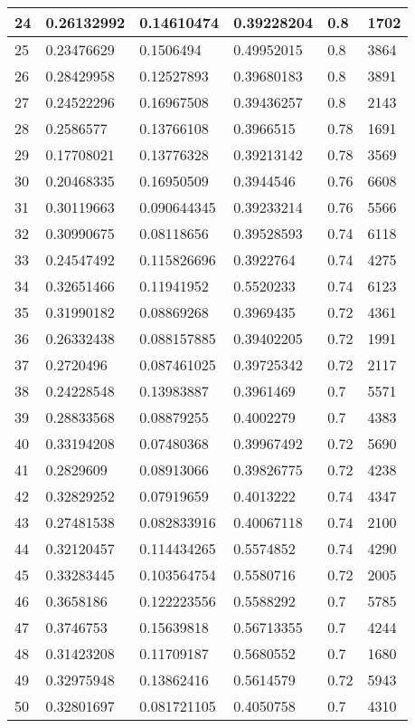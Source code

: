 \begin{longtable}{|l|l|l|l|l|l|}
24 & 0.26132992 & 0.14610474 & 0.39228204 & 0.8 & 1702 \\ \hline 
25 & 0.23476629 & 0.1506494 & 0.49952015 & 0.8 & 3864 \\ \hline 
26 & 0.28429958 & 0.12527893 & 0.39680183 & 0.8 & 3891 \\ \hline 
27 & 0.24522296 & 0.16967508 & 0.39436257 & 0.8 & 2143 \\ \hline 
28 & 0.2586577 & 0.13766108 & 0.3966515 & 0.78 & 1691 \\ \hline 
29 & 0.17708021 & 0.13776328 & 0.39213142 & 0.78 & 3569 \\ \hline 
30 & 0.20468335 & 0.16950509 & 0.3944546 & 0.76 & 6608 \\ \hline 
31 & 0.30119663 & 0.090644345 & 0.39233214 & 0.76 & 5566 \\ \hline 
32 & 0.30990675 & 0.08118656 & 0.39528593 & 0.74 & 6118 \\ \hline 
33 & 0.24547492 & 0.115826696 & 0.3922764 & 0.74 & 4275 \\ \hline 
34 & 0.32651466 & 0.11941952 & 0.5520233 & 0.74 & 6123 \\ \hline 
35 & 0.31990182 & 0.08869268 & 0.3969435 & 0.72 & 4361 \\ \hline 
36 & 0.26332438 & 0.088157885 & 0.39402205 & 0.72 & 1991 \\ \hline 
37 & 0.2720496 & 0.087461025 & 0.39725342 & 0.72 & 2117 \\ \hline 
38 & 0.24228548 & 0.13983887 & 0.3961469 & 0.7 & 5571 \\ \hline 
39 & 0.28833568 & 0.08879255 & 0.4002279 & 0.7 & 4383 \\ \hline 
40 & 0.33194208 & 0.07480368 & 0.39967492 & 0.72 & 5690 \\ \hline 
41 & 0.2829609 & 0.08913066 & 0.39826775 & 0.72 & 4238 \\ \hline 
42 & 0.32829252 & 0.07919659 & 0.4013222 & 0.74 & 4347 \\ \hline 
43 & 0.27481538 & 0.082833916 & 0.40067118 & 0.74 & 2100 \\ \hline 
44 & 0.32120457 & 0.114434265 & 0.5574852 & 0.74 & 4290 \\ \hline 
45 & 0.33283445 & 0.103564754 & 0.5580716 & 0.72 & 2005 \\ \hline 
46 & 0.3658186 & 0.122223556 & 0.5588292 & 0.7 & 5785 \\ \hline 
47 & 0.3746753 & 0.15639818 & 0.56713355 & 0.7 & 4244 \\ \hline 
48 & 0.31423208 & 0.11709187 & 0.5680552 & 0.7 & 1680 \\ \hline 
49 & 0.32975948 & 0.13862416 & 0.5614579 & 0.72 & 5943 \\ \hline 
50 & 0.32801697 & 0.081721105 & 0.4050758 & 0.7 & 4310 \\ \hline 
\end{longtable}